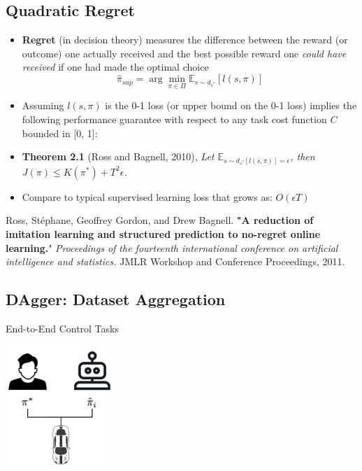\documentclass[10pt]{article}
\begin{document}
\subsection*{Quadratic Regret}
\begin{itemize}
	\item \textbf{Regret} (in decision theory) measures the difference between the reward (or outcome) one actually received and the best possible reward one \textit{could have received} if one had made the optimal choice
	\[\hat{\pi}_{sup} = \arg \min_{\pi \in \Pi} \mathbb{E}_{s \sim d_{s^*}} [l(s, \pi)]\]
    \item Assuming $l(s, \pi)$ is the 0-1 loss (or upper bound on the 0-1 loss) implies the following performance guarantee with respect to any task cost function $C$ bounded in [0, 1]:
    \item \textbf{Theorem 2.1} (Ross and Bagnell, 2010), \textit{Let $\mathbb{E}_{s \sim d_{s^*} [l(s, \pi)] = \epsilon}$, then $J(\pi) \leq K(\pi^*) + T^2 \epsilon$.}
    \item Compare to typical supervised learning loss that grows as: $O(\epsilon T)$    
\end{itemize}
Ross, Stéphane, Geoffrey Gordon, and Drew Bagnell. \textbf{"A reduction of imitation learning and structured prediction to no-regret online learning.}" \textit{Proceedings of the fourteenth international conference on artificial intelligence and statistics.} JMLR Workshop and Conference Proceedings, 2011.

\subsection*{DAgger: Dataset Aggregation}
End-to-End Control Tasks
\begin{center}
    \includegraphics*[width=0.3\textwidth]{L2_10.png}
\end{center}
\end{document}

